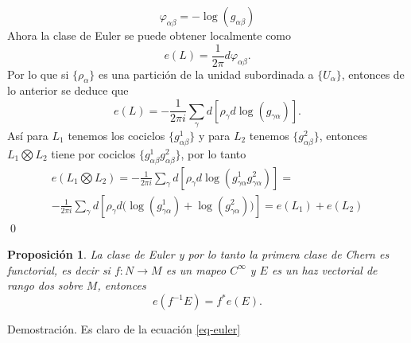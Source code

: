 \documentclass[letterpaper]{article}
\newtheorem{prop}[teorema]{Proposici\'on}
\newcommand{\dem}{{\noindent \sc Demostraci\'on. }}
\begin{document}
\[
    \varphi_{\alpha\beta}=-\log(g_{\alpha\beta})
\]
Ahora la clase de Euler se puede obtener localmente como
\[
    e(L)=\frac{1}{2\pi}d\varphi_{\alpha\beta}.
\]
Por lo que si \(\{\rho_{\alpha}\}\) es una partición de la unidad subordinada a \(\{U_{\alpha}\}\), entonces de lo anterior se deduce que
\begin{equation}\label{eq-euler}
    e(L)=-\frac{1}{2\pi i}\sum_{\gamma}d[\rho_{\gamma}d\log(g_{\gamma\alpha})].
\end{equation}
Así para \(L_1\) tenemos los cociclos \(\{g^{1}_{\alpha\beta}\}\) y para \(L_2\) tenemos \(\{g^{2}_{\alpha\beta}\}\), entonces \(L_1\bigotimes L_2\) tiene por cociclos \(\{g^{1}_{\alpha\beta}g^{2}_{\alpha\beta}\}\), por lo tanto
\begin{align*}
    e(L_1\bigotimes L_2)=-\frac{1}{2\pi i}\sum_{\gamma}d[\rho_{\gamma}d\log(g^{1}_{\gamma\alpha}g^{2}_{\gamma\alpha})]=\\
    -\frac{1}{2\pi i}\sum_{\gamma}d[\rho_{\gamma}d\big(\log(g^{1}_{\gamma\alpha})+\log(g^{2}_{\gamma\alpha})\big)]=e(L_1)+e(L_2)
\end{align*}
\qed
\begin{prop}
La clase de Euler y por lo tanto la primera clase de Chern es functorial, es decir si $f:N\rightarrow M$ es un mapeo $C^{\infty}$ y $E$ es un haz vectorial de rango dos sobre $M$, entonces
\[
    e(f^{-1}E)=f^{*}e(E).
\]
\end{prop}
\dem Es claro de la ecuación \ref{eq-euler}
\end{document}
